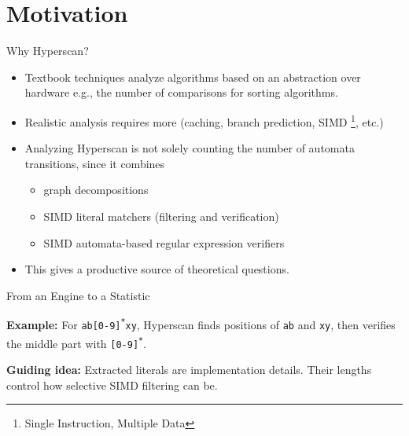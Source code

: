\section{Motivation}

\begin{frame}{Why Hyperscan?}
  \begin{itemize}
    \item Textbook techniques analyze algorithms based on an abstraction over hardware e.g., the number of comparisons for sorting algorithms.
    \item Realistic analysis requires more (caching, branch prediction, SIMD \footnote{Single Instruction, Multiple Data}, etc.)
    \item Analyzing Hyperscan is not solely counting the number of automata transitions, since it combines

          \begin{itemize}
            \item graph decompositions
            \item SIMD  literal matchers (filtering and verification)
            \item SIMD automata-based regular expression verifiers
          \end{itemize}

    \item This gives a productive source of theoretical questions.
  \end{itemize}
\end{frame}

\begin{frame}{From an Engine to a Statistic}
  \begin{center}
  \end{center}

  \vspace{0.35cm}

  \textbf{Example:} For
  \texttt{ab[0-9]}\textsuperscript{\texttt{*}}\texttt{xy},
  Hyperscan finds positions of \texttt{ab} and \texttt{xy},
  then verifies the middle part with
  \texttt{[0-9]}\textsuperscript{\texttt{*}}.

  \textbf{Guiding idea:} Extracted literals are implementation details.
  Their lengths control how selective SIMD filtering can be.
\end{frame}
